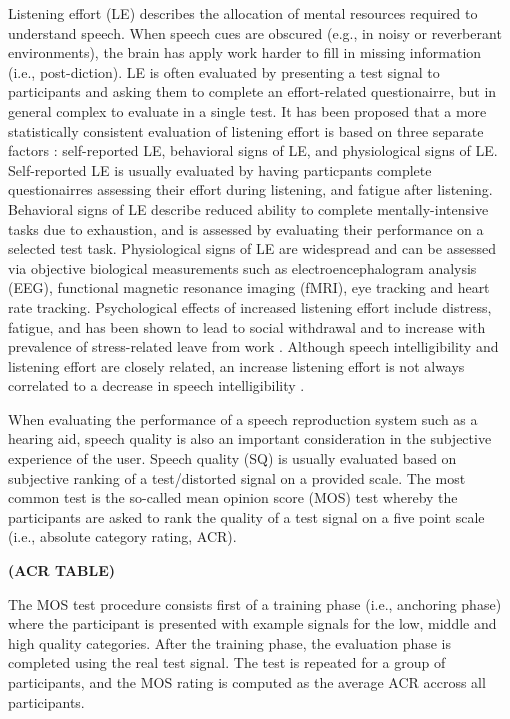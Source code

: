 Listening effort (LE) describes the allocation of mental resources required to understand speech. When speech cues are obscured (e.g., in noisy or reverberant environments), the brain has apply work harder to fill in missing information (i.e., post-diction). LE is often evaluated by presenting a test signal to participants and asking them to complete an effort-related questionairre, but in general complex to evaluate in a single test. It has been proposed that a more statistically consistent evaluation of listening effort is based on three separate factors \citep{shields2023exploring}: self-reported LE, behavioral signs of LE, and physiological signs of LE. Self-reported LE is usually evaluated by having particpants complete questionairres assessing their effort during listening, and fatigue after listening. Behavioral signs of LE describe reduced ability to complete mentally-intensive tasks due to exhaustion, and is assessed by evaluating their performance on a selected test task. Physiological signs of LE are widespread and can be assessed via objective biological measurements such as electroencephalogram analysis (EEG), functional magnetic resonance imaging (fMRI), eye tracking and heart rate tracking. Psychological effects of increased listening effort include distress, fatigue, and has been shown to lead to social withdrawal and to increase with prevalence of stress-related leave from work \citep{ohlenforst2017effects}. Although speech intelligibility and listening effort are closely related, an increase listening effort is not always correlated to a decrease in speech intelligibility \citep{winn2021listening}.

When evaluating the performance of a speech reproduction system such as a hearing aid, speech quality is also an important consideration in the subjective experience of the user. Speech quality (SQ) is usually evaluated based on subjective ranking of a test/distorted signal on a provided scale.  The most common test is the so-called mean opinion score (MOS) test whereby the participants are asked to rank the quality of a test signal on a five point scale (i.e., absolute category rating, ACR). 

\textbf{(ACR TABLE)}

The MOS test procedure consists first of a training phase (i.e., anchoring phase) where the participant is presented with example signals for the low, middle and high quality categories. After the training phase, the evaluation phase is completed using the real test signal. The test is repeated for a group of participants, and the MOS rating is computed as the average ACR accross all participants.

